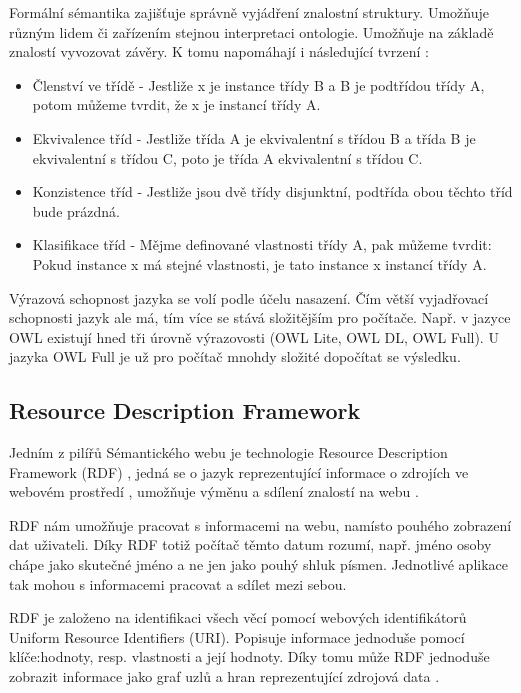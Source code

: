 Formální sémantika zajišťuje správně vyjádření znalostní struktury. Umožňuje různým lidem či zařízením stejnou interpretaci ontologie. 
Umožňuje na základě znalostí vyvozovat závěry. K tomu napomáhají i následující tvrzení \cite{staab}:
\begin{itemize}
\item Členství ve třídě - Jestliže x je instance třídy B a B je podtřídou třídy A, potom můžeme tvrdit, že x je instancí třídy A.
\item Ekvivalence tříd - Jestliže třída A je ekvivalentní s třídou B a třída B je ekvivalentní s třídou C, poto je třída A ekvivalentní s třídou C.
\item Konzistence tříd - Jestliže jsou dvě třídy disjunktní, podtřída obou těchto tříd bude prázdná.
\item Klasifikace tříd - Mějme definované vlastnosti třídy A, pak můžeme tvrdit: Pokud instance x má stejné vlastnosti, je tato instance x instancí třídy A.
\end{itemize}

Výrazová schopnost jazyka se volí podle účelu nasazení. Čím větší vyjadřovací schopnosti jazyk ale má, tím více se stává složitějším pro počítače.
Např. v jazyce OWL existují hned tři úrovně výrazovosti (OWL Lite, OWL DL, OWL Full). 
U jazyka OWL Full je už pro počítač mnohdy složité dopočítat se výsledku.

    \subsection{Resource Description Framework}
        
        Jedním z pilířů Sémantického webu je technologie Resource Description Framework (RDF) \cite{semWeb}, 
        jedná se o jazyk reprezentující informace o zdrojích ve webovém prostředí \cite{RDFprimer}, umožňuje výměnu a sdílení znalostí na webu \cite{RDF}.
        
        RDF nám umožňuje pracovat s informacemi na webu, namísto pouhého zobrazení dat uživateli. Díky RDF totiž počítač těmto datum rozumí, např. jméno osoby chápe jako skutečné jméno a ne jen jako pouhý shluk písmen. Jednotlivé aplikace tak mohou s informacemi pracovat a sdílet mezi sebou. 
        
        RDF je založeno na identifikaci všech věcí pomocí webových identifikátorů Uniform Resource Identifiers (URI). Popisuje informace jednoduše pomocí klíče:hodnoty, resp. vlastnosti a její hodnoty. Díky tomu může RDF jednoduše zobrazit informace jako graf uzlů a hran reprezentující zdrojová data \cite{RDFprimer}.
        
